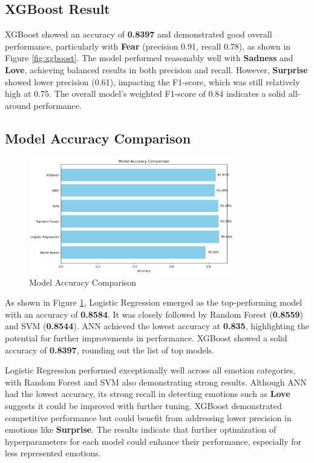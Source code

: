 \subsection{XGBoost Result}
XGBoost showed an accuracy of \textbf{0.8397} and demonstrated good overall performance, particularly with \textbf{Fear} (precision 0.91, recall 0.78), as shown in Figure \ref{fig:xgboost}. The model performed reasonably well with \textbf{Sadness} and \textbf{Love}, achieving balanced results in both precision and recall. However, \textbf{Surprise} showed lower precision (0.61), impacting the F1-score, which was still relatively high at 0.75. The overall model's weighted F1-score of 0.84 indicates a solid all-around performance.

\subsection{Model Accuracy Comparison}
\begin{figure}[h!]
\centering
\includegraphics[width=0.8\textwidth]{model_accuracy.png}
\caption{Model Accuracy Comparison}
\label{fig:model_accuracy}
\end{figure}

As shown in Figure \ref{fig:model_accuracy}, Logistic Regression emerged as the top-performing model with an accuracy of \textbf{0.8584}. It was closely followed by Random Forest (\textbf{0.8559}) and SVM (\textbf{0.8544}). ANN achieved the lowest accuracy at \textbf{0.835}, highlighting the potential for further improvements in performance. XGBoost showed a solid accuracy of \textbf{0.8397}, rounding out the list of top models.

Logistic Regression performed exceptionally well across all emotion categories, with Random Forest and SVM also demonstrating strong results. Although ANN had the lowest accuracy, its strong recall in detecting emotions such as \textbf{Love} suggests it could be improved with further tuning. XGBoost demonstrated competitive performance but could benefit from addressing lower precision in emotions like \textbf{Surprise}. The results indicate that further optimization of hyperparameters for each model could enhance their performance, especially for less represented emotions.

